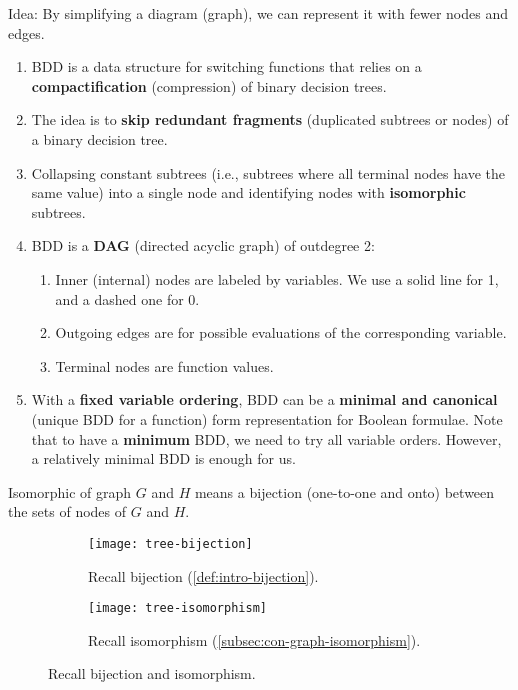 \documentclass[../src/handouts/main.tex]{subfiles}
\begin{document}
Idea: By simplifying a diagram (graph), we can represent it with fewer nodes and edges.

\begin{enumerate}
  \item BDD is a data structure for switching functions that relies on a \textbf{compactification} (compression) of binary decision trees.
  \item The idea is to \textbf{skip redundant fragments} (duplicated subtrees or nodes) of a binary decision tree.
  \item Collapsing constant subtrees (i.e., subtrees where all terminal nodes have the same value) into a single node and identifying nodes with \textbf{isomorphic} subtrees.
  \item BDD is a \textbf{DAG} (directed acyclic graph) of outdegree 2:
    \begin{enumerate}
      \item Inner (internal) nodes are labeled by variables.
         We use a solid line for 1, and a dashed one for 0. 
      \item Outgoing edges are for possible evaluations of the corresponding variable.
      \item Terminal nodes are function values.
    \end{enumerate}
  \item With a \textbf{fixed variable ordering}, BDD can be a \textbf{minimal and canonical} (unique BDD for a function) form representation for Boolean formulae. Note that to have a \textbf{minimum} BDD, we need to try all variable orders. However, a relatively minimal BDD is enough for us.
\end{enumerate}

Isomorphic of graph $G$ and $H$ means a bijection (one-to-one and onto) between the sets of nodes of $G$ and $H$.

\begin{figure}[htbp]
  \centering
  \begin{subfigure}[t]{.3\textwidth}
    \centering
    \texttt{[image: tree-bijection]}
    \caption{Recall bijection (\cref{def:intro-bijection}).}
    \label{fig:tree-bijection}
  \end{subfigure}
  \hfill
  \begin{subfigure}[t]{.5\textwidth}
    \centering
    \texttt{[image: tree-isomorphism]}
    \caption{Recall isomorphism (\cref{subsec:con-graph-isomorphism}).}
    \label{fig:tree-isomorphism}
  \end{subfigure}
  \caption{Recall bijection and isomorphism.}
  \label{fig:tree-bijection-isomorphism}
\end{figure}
\end{document}
